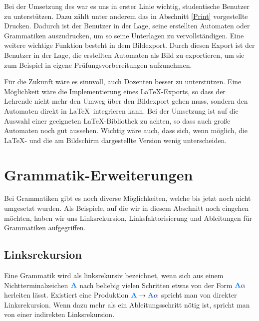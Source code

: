 Bei der Umsetzung des \gtitools war es uns in erster Linie wichtig, studentische
Benutzer zu unterstützen. Dazu zählt unter anderem das in Abschnitt \ref{Print}
vorgestellte Drucken. Dadurch ist der Benutzer in der Lage, seine erstellten
Automaten oder Grammatiken auszudrucken, um so seine Unterlagen zu
vervollständigen. Eine weitere wichtige Funktion besteht in dem Bildexport.
Durch diesen Export ist der Benutzer in der Lage, die erstellten Automaten als
Bild zu exportieren, um sie zum Beispiel in eigene Prüfungsvorbereitungen
aufzunehmen.\vspace{10pt}

Für die Zukunft wäre es sinnvoll, auch Dozenten besser zu
unterstützen. Eine Möglichkeit wäre die Implementierung eines \LaTeX-Exports, so
dass der Lehrende nicht mehr den Umweg über den Bildexport gehen muss, sondern
den Automaten direkt in \LaTeX\ integrieren kann. Bei der Umsetzung ist auf die
Auswahl einer geeigneten \LaTeX-Bibliothek zu achten, so dass auch große
Automaten noch gut aussehen. Wichtig wäre auch, dass sich, wenn möglich, die
\LaTeX- und die am Bildschirm dargestellte Version wenig
unterscheiden.\vspace{10pt}


\section{Grammatik-Erweiterungen}\label{PerspectiveGrammar}

Bei Grammatiken gibt es noch diverse Möglichkeiten, welche bis jetzt noch nicht
umgesetzt wurden. Als Beispiele, auf die wir in diesem Abschnitt noch eingehen
möchten, haben wir uns Linksrekursion, Linksfaktorisierung und
Ableitungen für Grammatiken aufgegriffen.\vspace{10pt}


\subsection{Linksrekursion}\label{PerspectiveLeftrecursion}

Eine Grammatik wird als linksrekursiv bezeichnet, wenn sich aus einem
Nichtterminalzeichen $\NonterminalSymbol{A}$ nach beliebig vielen Schritten etwas
von der Form $\NonterminalSymbol{A} \TerminalSymbol{$\alpha$}$ herleiten lässt.
Existiert eine Produktion $\NonterminalSymbol{A} \to \NonterminalSymbol{A}
\TerminalSymbol{$\alpha$}$ spricht man von direkter Linksrekursion. Wenn dazu
mehr als ein Ableitungsschritt nötig ist, spricht man von einer indirekten
Linksrekursion.\vspace{10pt}

